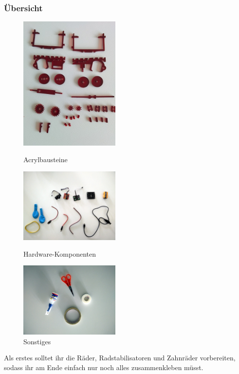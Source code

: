 \documentclass[12pt,a4paper]{article}
\begin{document}
\subsubsection{Übersicht}

\begin{figure}[ht]
	\begin{minipage}{0.33\textwidth}
		\includegraphics[width=5cm]{./graphics/teile}
		\caption{Acrylbausteine}
	\end{minipage}
	\begin{minipage}{0.33\textwidth}
		\includegraphics[width=5cm]{./graphics/material_2.jpg}
		\caption{Hardware-Komponenten}
	\end{minipage}
	\begin{minipage}{0.33\textwidth}
		\includegraphics[width=5cm]{./graphics/material_3.jpg}
		\caption{Sonstiges}
	\end{minipage}
\end{figure}

Als erstes solltet ihr die Räder,  Radstabilisatoren und Zahnräder vorbereiten, sodass ihr am Ende einfach nur noch alles zusammenkleben müsst.
\end{document}
